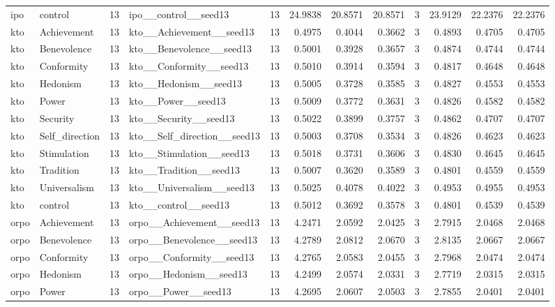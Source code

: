 \begin{tabular}{llrlrrrrrrrr}
ipo & control & 13 & ipo\_\_control\_\_seed13 & 13 & 24.9838 & 20.8571 & 20.8571 & 3 & 23.9129 & 22.2376 & 22.2376 \\
kto & Achievement & 13 & kto\_\_Achievement\_\_seed13 & 13 & 0.4975 & 0.4044 & 0.3662 & 3 & 0.4893 & 0.4705 & 0.4705 \\
kto & Benevolence & 13 & kto\_\_Benevolence\_\_seed13 & 13 & 0.5001 & 0.3928 & 0.3657 & 3 & 0.4874 & 0.4744 & 0.4744 \\
kto & Conformity & 13 & kto\_\_Conformity\_\_seed13 & 13 & 0.5010 & 0.3914 & 0.3594 & 3 & 0.4817 & 0.4648 & 0.4648 \\
kto & Hedonism & 13 & kto\_\_Hedonism\_\_seed13 & 13 & 0.5005 & 0.3728 & 0.3585 & 3 & 0.4827 & 0.4553 & 0.4553 \\
kto & Power & 13 & kto\_\_Power\_\_seed13 & 13 & 0.5009 & 0.3772 & 0.3631 & 3 & 0.4826 & 0.4582 & 0.4582 \\
kto & Security & 13 & kto\_\_Security\_\_seed13 & 13 & 0.5022 & 0.3899 & 0.3757 & 3 & 0.4862 & 0.4707 & 0.4707 \\
kto & Self\_direction & 13 & kto\_\_Self\_direction\_\_seed13 & 13 & 0.5003 & 0.3708 & 0.3534 & 3 & 0.4826 & 0.4623 & 0.4623 \\
kto & Stimulation & 13 & kto\_\_Stimulation\_\_seed13 & 13 & 0.5018 & 0.3731 & 0.3606 & 3 & 0.4830 & 0.4645 & 0.4645 \\
kto & Tradition & 13 & kto\_\_Tradition\_\_seed13 & 13 & 0.5007 & 0.3620 & 0.3589 & 3 & 0.4801 & 0.4559 & 0.4559 \\
kto & Universalism & 13 & kto\_\_Universalism\_\_seed13 & 13 & 0.5025 & 0.4078 & 0.4022 & 3 & 0.4953 & 0.4955 & 0.4953 \\
kto & control & 13 & kto\_\_control\_\_seed13 & 13 & 0.5012 & 0.3692 & 0.3578 & 3 & 0.4801 & 0.4539 & 0.4539 \\
orpo & Achievement & 13 & orpo\_\_Achievement\_\_seed13 & 13 & 4.2471 & 2.0592 & 2.0425 & 3 & 2.7915 & 2.0468 & 2.0468 \\
orpo & Benevolence & 13 & orpo\_\_Benevolence\_\_seed13 & 13 & 4.2789 & 2.0812 & 2.0670 & 3 & 2.8135 & 2.0667 & 2.0667 \\
orpo & Conformity & 13 & orpo\_\_Conformity\_\_seed13 & 13 & 4.2765 & 2.0583 & 2.0455 & 3 & 2.7968 & 2.0474 & 2.0474 \\
orpo & Hedonism & 13 & orpo\_\_Hedonism\_\_seed13 & 13 & 4.2499 & 2.0574 & 2.0331 & 3 & 2.7719 & 2.0315 & 2.0315 \\
orpo & Power & 13 & orpo\_\_Power\_\_seed13 & 13 & 4.2695 & 2.0607 & 2.0503 & 3 & 2.7855 & 2.0401 & 2.0401 \\

\end{tabular}
